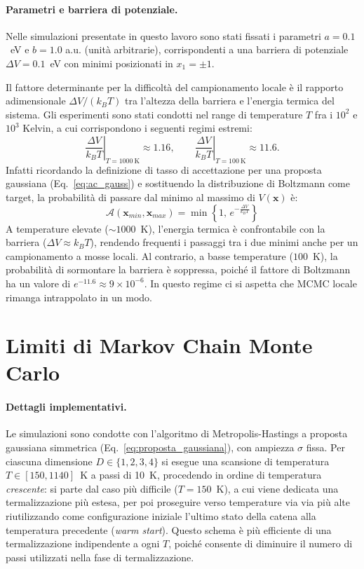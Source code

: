 \paragraph*{Parametri e barriera di potenziale.}
Nelle simulazioni presentate in questo lavoro sono stati fissati i parametri $a = 0.1$~eV e $b = 1.0$ a.u. (unità arbitrarie), corrispondenti a una barriera di potenziale $\Delta V = 0.1$~eV con minimi posizionati in $x_1 = \pm 1$.

Il fattore determinante per la difficoltà del campionamento locale è il rapporto adimensionale $\Delta V / (k_B T)$ tra l'altezza della barriera e l'energia termica del sistema. Gli esperimenti sono stati condotti nel range di temperature $T$ fra i $10^{2}$ e $10^{3}$ Kelvin, a cui corrispondono i seguenti regimi estremi:
\begin{equation}
    \left.\frac{\Delta V}{k_B T}\right|_{T = 1000~\text{K}} \approx 1.16,
    \qquad
    \left.\frac{\Delta V}{k_B T}\right|_{T = 100~\text{K}} \approx 11.6.
\end{equation}
Infatti ricordando la definizione di tasso di accettazione per una proposta gaussiana (Eq.~\ref{eq:ac_gauss}) e sostituendo la distribuzione di Boltzmann come target, la probabilità di passare dal minimo al massimo di $V(\mathbf{x})$ è:
\begin{equation}
    \label{eq:ac_barrier}
\mathcal{A}(\mathbf{x}_{min}, \mathbf{x}_{max}) = \min \left\{ 1, \, e^{-\frac{\Delta V}{k_B T}} \right\}
\end{equation}
A temperature elevate ($\sim 1000$~K), l'energia termica è confrontabile con la barriera ($\Delta V \approx k_B T$), rendendo frequenti i passaggi tra i due minimi anche per un campionamento a mosse locali. Al contrario, a basse temperature ($100$~K), la probabilità di sormontare la barriera è soppressa, poiché il fattore di Boltzmann ha un valore di $e^{-11.6} \approx 9\times10^{-6}$. In questo regime ci si aspetta che MCMC locale rimanga intrappolato in un modo.
\section{Limiti di Markov Chain Monte Carlo}
\label{sec:limiti_mcmc}
\paragraph*{Dettagli implementativi.}
Le simulazioni sono condotte con l'algoritmo di Metropolis-Hastings a proposta gaussiana simmetrica (Eq.~\ref{eq:proposta_gaussiana}), con ampiezza $\sigma$ fissa. Per ciascuna dimensione $D \in \{1,2,3,4\}$ si esegue una scansione di temperatura $T \in [150, 1140]$~K a passi di 10~K, procedendo in ordine di temperatura \emph{crescente}: si parte dal caso più difficile ($T=150$~K), a cui viene dedicata una termalizzazione più estesa, per poi proseguire verso temperature via via più alte riutilizzando come configurazione iniziale l'ultimo stato della catena alla temperatura precedente (\emph{warm start}). Questo schema è più efficiente di una termalizzazione indipendente a ogni $T$, poiché consente di diminuire il numero di passi utilizzati nella fase di termalizzazione.

